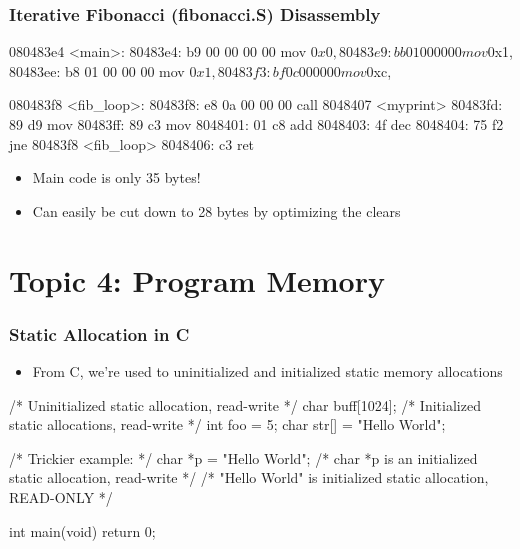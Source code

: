 \documentclass[11pt,xcolor=dvipsnames]{beamer}
\newcommand{\vs}{\vspace{0.5em}}
\begin{document}
\begin{frame}[fragile,t]
\frametitle{Iterative Fibonacci (fibonacci.S) Disassembly}
\begin{customobjdumpcode}
080483e4 <main>:
 80483e4: b9 00 00 00 00        mov    $0x0,%
 80483e9: bb 01 00 00 00        mov    $0x1,%
 80483ee: b8 01 00 00 00        mov    $0x1,%
 80483f3: bf 0c 00 00 00        mov    $0xc,%

080483f8 <fib_loop>:
 80483f8: e8 0a 00 00 00        call   8048407 <myprint>
 80483fd: 89 d9                 mov    %
 80483ff: 89 c3                 mov    %
 8048401: 01 c8                 add    %
 8048403: 4f                    dec    %
 8048404: 75 f2                 jne    80483f8 <fib_loop>
 8048406: c3                    ret
\end{customobjdumpcode}
\begin{itemize}
  \item Main code is only 35 bytes!
  \item Can easily be cut down to 28 bytes by optimizing the clears
\end{itemize}
\end{frame}

\section{Topic 4: Program Memory}

\begin{frame}[fragile,t]
\frametitle{Static Allocation in C}
\begin{itemize}
  \item From C, we're used to uninitialized and initialized static memory allocations
\end{itemize}
\vs
\begin{ccode}
/* Uninitialized static allocation, read-write */
char buff[1024];
/* Initialized static allocations, read-write */
int foo = 5;
char str[] = "Hello World";
\end{ccode}
\pause
\begin{ccode}

/* Trickier example: */
char *p = "Hello World";
/* char *p is an initialized static allocation, read-write */
/* "Hello World" is initialized static allocation, READ-ONLY */

int main(void) {
  return 0;
}
\end{ccode}
\end{frame}
\end{document}
